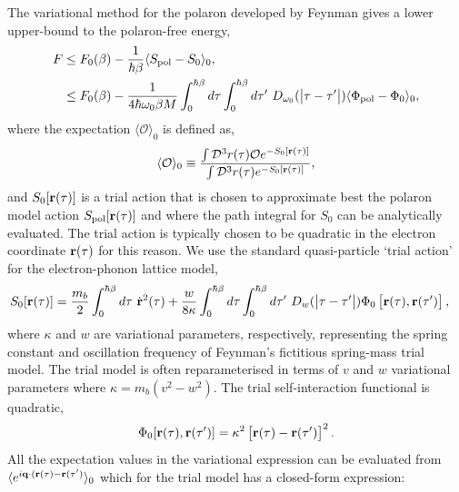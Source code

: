 The variational method for the polaron developed by Feynman gives a lower upper-bound to the polaron-free energy,
\begin{equation}
    \begin{aligned}
         F &\leq F_0(\beta) - \frac{1}{\hbar\beta} \langle S_{\text{pol}} - S_{0} \rangle_0 , \\
         &\leq F_0(\beta) -\frac{1}{4\hbar\omega_0\beta M} \int_0^{\hbar\beta} d\tau \int_0^{\hbar\beta} d\tau'\ D_{\omega_0}(\abs{\tau - \tau'}) \langle \Phi_{\text{pol}} - \Phi_0 \rangle_0 ,
    \end{aligned}
\end{equation}
where the expectation $\langle \mathcal{O} \rangle_0$ is defined as,
\begin{equation}
    \langle \mathcal{O} \rangle_0 \equiv \frac{\int \mathcal{D}^3 r(\tau) \mathcal{O} e^{-S_0[\vb{r}(\tau)]}}{\int \mathcal{D}^3 r(\tau) e^{-S_0[\vb{r}(\tau)]}},
\end{equation}
and $S_0[\vb{r}(\tau)]$ is a trial action that is chosen to approximate best the polaron model action $S_{\text{pol}}[\vb{r}(\tau)]$ and where the path integral for $S_0$ can be analytically evaluated. The trial action is typically chosen to be quadratic in the electron coordinate $\vb{r}(\tau)$ for this reason. We use the standard quasi-particle `trial action' for the electron-phonon lattice model, 
\begin{equation}
    \begin{aligned}
        S_{0}[\vb{r}(\tau)] &= \frac{m_b}{2} \int_0^{\hbar\beta} d\tau\ \Dot{\vb{r}}^2(\tau) + \frac{w}{8 \kappa} \int_0^{\hbar\beta} d\tau \int_0^{\hbar\beta} d\tau'\ D_{w}(\abs{\tau - \tau'}) \Phi_0\left[\vb{r}(\tau), \vb{r}(\tau')\right] ,
    \end{aligned}
\end{equation}
where $\kappa$ and $w$ are variational parameters, respectively, representing the spring constant and oscillation frequency of Feynman's fictitious spring-mass trial model. The trial model is often reparameterised in terms of $v$ and $w$ variational parameters where $\kappa = m_b (v^2 - w^2)$. The trial self-interaction functional is quadratic,
\begin{equation}
    \Phi_0[\vb{r}(\tau), \vb{r}(\tau')] = \kappa^2 \left[\vb{r}(\tau) - \vb{r}(\tau')\right]^2 .
\end{equation}
All the expectation values in the variational expression can be evaluated from $\langle e^{i \vb{q} \cdot (\vb{r}(\tau) - \vb{r}(\tau')} \rangle_0$ which for the trial model has a closed-form expression:
